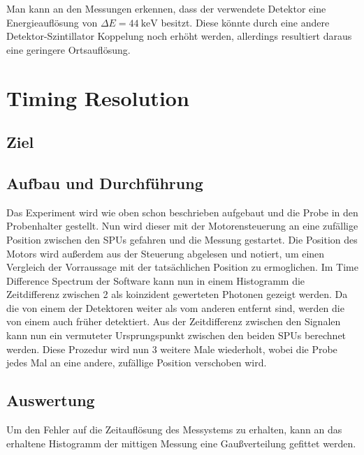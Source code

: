 \documentclass[12pt,twoside,a4paper]{scrartcl}
\begin{document}
		Man kann an den Messungen erkennen, dass der verwendete Detektor eine Energieauflösung von $\Delta E = \SI{44}{\kilo \electronvolt}$ besitzt. Diese könnte durch eine andere Detektor-Szintillator Koppelung noch erhöht werden, allerdings resultiert daraus eine geringere Ortsauflösung.

		\section{Timing Resolution}

			\subsection{Ziel}

			\subsection{Aufbau und Durchführung}
				Das Experiment wird wie oben schon beschrieben aufgebaut und die Probe in den Probenhalter gestellt. Nun wird dieser mit der Motorensteuerung an eine zufällige Position zwischen den SPUs gefahren und die Messung gestartet. Die Position des Motors wird außerdem aus der Steuerung abgelesen und notiert, um einen Vergleich der Vorraussage mit der tatsächlichen Position zu ermoglichen. Im Time Difference Spectrum der Software kann nun in einem Histogramm die Zeitdifferenz zwischen 2 als koinzident gewerteten Photonen gezeigt werden. Da die von einem der Detektoren weiter als vom anderen entfernt sind, werden die von einem auch früher detektiert. Aus der Zeitdifferenz zwischen den Signalen kann nun ein vermuteter Ursprungspunkt zwischen den beiden SPUs berechnet werden. Diese Prozedur wird nun 3 weitere Male wiederholt, wobei die Probe jedes Mal an eine andere, zufällige Position verschoben wird.

				\subsection{Auswertung}
					Um den Fehler auf die Zeitauflösung des Messystems zu erhalten, kann an das erhaltene Histogramm der mittigen Messung eine Gaußverteilung gefittet werden.
\end{document}
